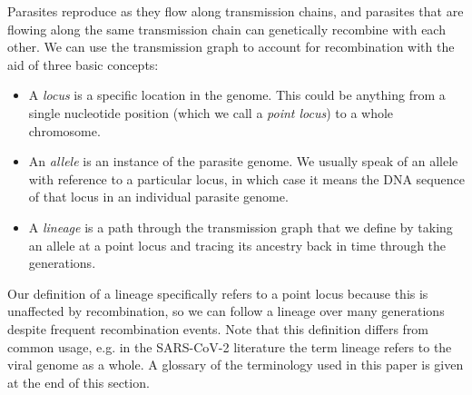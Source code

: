 \documentclass[_main.tex]{subfiles}
\begin{document}


Parasites reproduce as they flow along transmission chains, and parasites that are flowing along the same transmission chain can genetically recombine with each other. We can use the transmission graph to account for recombination with the aid of three basic concepts:

\begin{itemize}[noitemsep]

\item A \textit{locus} is a specific location in the genome.  This could be anything from a single nucleotide position (which we call a \textit{point locus}) to a whole chromosome.

\item  An \textit{allele} is an instance of the parasite genome.  We usually speak of an allele with reference to a particular locus, in which case it means the DNA sequence of that locus in an individual parasite genome.

\item A \textit{lineage} is a path through the transmission graph that we define by taking an allele at a point locus and tracing its ancestry back in time through the generations. 

\end{itemize}

Our definition of a lineage specifically refers to a point locus because this is unaffected by recombination, so we can follow a lineage over many generations despite frequent recombination events.  Note that this definition differs from common usage, e.g. in the SARS-CoV-2 literature the term lineage refers to the viral genome as a whole.  A glossary of the terminology used in this paper is given at the end of this section.
\end{document}
